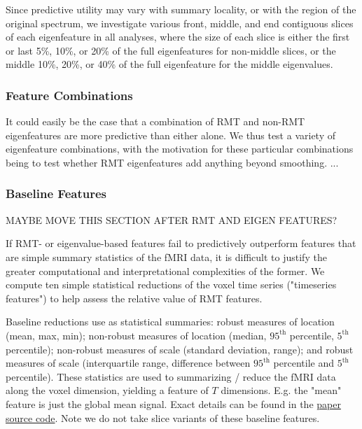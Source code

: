 \documentclass[12pt]{spieman}  %
\begin{document}
\begin{spacing}{2}
Since predictive utility may vary with summary locality, or with the region of
the original spectrum, we investigate various front, middle, and end contiguous
slices of each eigenfeature in all analyses, where the size of each slice is
either the first or last 5\%, 10\%, or 20\% of the full eigenfeatures for
non-middle slices, or the middle 10\%, 20\%, or 40\% of the full eigenfeature for
the middle eigenvalues.

\subsubsection{Feature Combinations}

It could easily be the case that a combination of RMT and non-RMT eigenfeatures
are more predictive than either alone. We thus test a variety of eigenfeature
combinations, with the motivation for these particular combinations being to
test whether RMT eigenfeatures add anything beyond smoothing.
...




\subsubsection{Baseline Features}
\label{sec:baselines}

MAYBE MOVE THIS SECTION AFTER RMT AND EIGEN FEATURES?

If RMT- or eigenvalue-based features fail to predictively outperform features
that are simple summary statistics of the fMRI data, it is difficult to justify
the greater computational and interpretational complexities of the former. We
compute ten simple statistical reductions of the voxel time series ("timeseries
features") to help assess the relative value of RMT features.

Baseline reductions use as statistical summaries: robust measures of location
(mean, max, min); non-robust measures of location (median, \(95^{\text{th}}\)
percentile, \(5^{\text{th}}\) percentile); non-robust measures of scale
(standard deviation, range); and robust measures of scale (interquartile range,
difference between \(95^{\text{th}}\) percentile and \(5^{\text{th}}\)
percentile). These statistics are used to summarizing / reduce the fMRI data
along the voxel dimension, yielding a feature of \(T\) dimensions. E.g. the "mean"
feature is just the global mean signal. Exact details can be found in the
\href{https://github.com/DM-Berger/random-matrix-fmri/blob/master/code/rmt/enumerables.py#L51-L69}{paper
source code}. Note we do not take slice variants of these baseline features.


\end{spacing}
\end{document}
